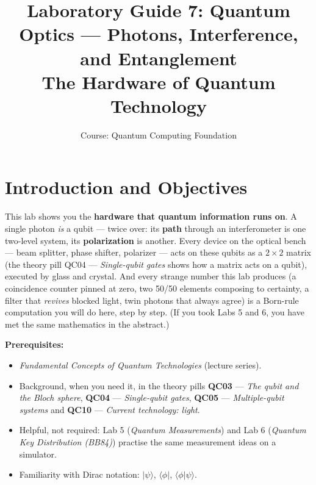 \documentclass[a4paper,11pt]{article}
\title{\textbf{Laboratory Guide 7: Quantum Optics --- Photons, Interference, and Entanglement}\\
\large The Hardware of Quantum Technology}
\author{Course: Quantum Computing Foundation}
\date{}
\providecommand{\ket}[1]{|#1\rangle}
\providecommand{\bra}[1]{\langle#1|}
\providecommand{\braket}[2]{\langle#1|#2\rangle}
\begin{document}
\maketitle

\section{Introduction and Objectives}

This lab shows you the \textbf{hardware that quantum information runs on}. A single
photon \emph{is} a qubit --- twice over: its \textbf{path} through an interferometer is
one two-level system, its \textbf{polarization} is another. Every device on the
optical bench --- beam splitter, phase shifter, polarizer --- acts on these qubits as a
$2\times 2$ matrix (the theory pill QC04 --- \textit{Single-qubit gates} shows how a
matrix acts on a qubit), executed by glass and crystal. And every strange number this
lab produces (a coincidence counter pinned at zero, two 50/50 elements composing to
certainty, a filter that \emph{revives} blocked light, twin photons that always agree)
is a Born-rule computation you will do here, step by step. (If you took Labs 5 and 6,
you have met the same mathematics in the abstract.)

\vspace{0.3cm}
\noindent\textbf{Prerequisites:}
\begin{itemize}
    \item \textit{Fundamental Concepts of Quantum Technologies} (lecture series).
    \item Background, when you need it, in the theory pills \textbf{QC03} ---
          \textit{The qubit and the Bloch sphere}, \textbf{QC04} --- \textit{Single-qubit
          gates}, \textbf{QC05} --- \textit{Multiple-qubit systems} and \textbf{QC10} ---
          \textit{Current technology: light}.
    \item Helpful, not required: Lab 5 (\textit{Quantum Measurements}) and Lab 6
          (\textit{Quantum Key Distribution (BB84)}) practise the same measurement ideas
          on a simulator.
    \item Familiarity with Dirac notation: $\ket{\psi}$, $\bra{\phi}$, $\braket{\phi}{\psi}$.
\end{itemize}
\end{document}
